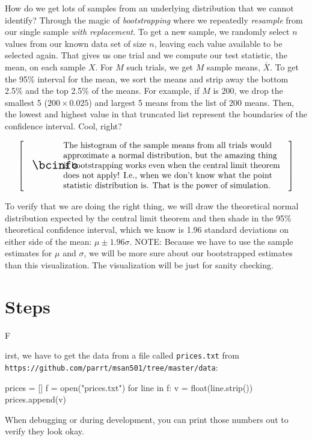 \documentclass[titlepage]{tufte-book}
\makeatletter
\newcounter{problem}
\newcommand{\step}[1]{{}
\vspace{4pt} \noindent {\bf \theproblem. }#1\addtocounter{problem}{1}}
\newenvironment{callout}[1]{
\[
  \left[
      \begin{tabular}{@{\quad}m{.05\textwidth}@{\qquad}m{.75\textwidth}@{\quad}}
        \scalebox{1.5}{#1} & 
          \raggedright%
}
{
      \end{tabular}
    \right]
\]
}
\makeatother
\begin{document}
\begin{fullwidth}
How do we get lots of samples from an underlying distribution that we cannot identify? Through the magic of {\em bootstrapping} where we repeatedly {\em resample} from our single sample {\em with replacement}.  To get a new sample, we randomly select $n$ values from our known data set of size $n$, leaving each value available to be selected again. That gives us one trial and we compute our test statistic, the mean, on each sample $X$.  For $M$ such trials, we get $M$ sample means, $\bar{X}$.  To get the 95\% interval for the mean, we sort the means and strip away the bottom 2.5\% and the top 2.5\% of the means. For example, if $M$ is 200, we drop the smallest 5 ($200 \times 0.025$) and largest 5 means from the list of 200 means. Then, the lowest and highest value in that truncated list represent the boundaries of the confidence interval. Cool, right?

\begin{callout}{\bcinfo}
The histogram of the sample means from all trials would approximate a normal distribution, but the amazing thing is bootstrapping works even when the central limit theorem does not apply! I.e., when we don't know what the point statistic distribution is. That is the power of simulation.
\end{callout}

To verify that we are doing the right thing, we will draw the theoretical normal distribution expected by the central limit theorem and then shade in the 95\% theoretical confidence interval, which we know is 1.96 standard deviations on either side of the mean: $\mu \pm 1.96\sigma$. NOTE: Because we have to use the sample estimates for $\mu$ and $\sigma$, we will be more sure about our bootstrapped estimates than this visualization. The visualization will be just for sanity checking.

\section{Steps}

\step First, we have to get the data from a file called {\tt prices.txt} from \\
{\tt\small https://github.com/parrt/msan501/tree/master/data}:

\begin{pyverbatim}
prices = []
f = open("prices.txt")
for line in f:
	v = float(line.strip())
	prices.append(v)
\end{pyverbatim}

When debugging or during development, you can print those numbers out to verify they look okay.


\end{fullwidth}
\end{document}
